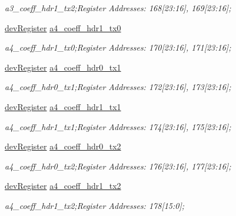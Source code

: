 \begin{DoxyCompactItemize}
\begin{DoxyCompactList}\small\item\em a3\+\_\+coeff\+\_\+hdr1\+\_\+tx2;Register Addresses\+: 168\mbox{[}23\+:16\mbox{]}, 169\mbox{[}23\+:16\mbox{]}; \end{DoxyCompactList}\item 
\mbox{\hyperlink{classdev_register}{dev\+Register}} \mbox{\hyperlink{class_o_p_t3101_registers_abbec89374c9be99384fb541186d2cb9a}{a4\+\_\+coeff\+\_\+hdr1\+\_\+tx0}}
\begin{DoxyCompactList}\small\item\em a4\+\_\+coeff\+\_\+hdr1\+\_\+tx0;Register Addresses\+: 170\mbox{[}23\+:16\mbox{]}, 171\mbox{[}23\+:16\mbox{]}; \end{DoxyCompactList}\item 
\mbox{\hyperlink{classdev_register}{dev\+Register}} \mbox{\hyperlink{class_o_p_t3101_registers_ae1c362f1589d397df087d03639372e29}{a4\+\_\+coeff\+\_\+hdr0\+\_\+tx1}}
\begin{DoxyCompactList}\small\item\em a4\+\_\+coeff\+\_\+hdr0\+\_\+tx1;Register Addresses\+: 172\mbox{[}23\+:16\mbox{]}, 173\mbox{[}23\+:16\mbox{]}; \end{DoxyCompactList}\item 
\mbox{\hyperlink{classdev_register}{dev\+Register}} \mbox{\hyperlink{class_o_p_t3101_registers_a3780f5fcbbb53be998847844966aa092}{a4\+\_\+coeff\+\_\+hdr1\+\_\+tx1}}
\begin{DoxyCompactList}\small\item\em a4\+\_\+coeff\+\_\+hdr1\+\_\+tx1;Register Addresses\+: 174\mbox{[}23\+:16\mbox{]}, 175\mbox{[}23\+:16\mbox{]}; \end{DoxyCompactList}\item 
\mbox{\hyperlink{classdev_register}{dev\+Register}} \mbox{\hyperlink{class_o_p_t3101_registers_ab678cdb94b74b62bf199208e10982059}{a4\+\_\+coeff\+\_\+hdr0\+\_\+tx2}}
\begin{DoxyCompactList}\small\item\em a4\+\_\+coeff\+\_\+hdr0\+\_\+tx2;Register Addresses\+: 176\mbox{[}23\+:16\mbox{]}, 177\mbox{[}23\+:16\mbox{]}; \end{DoxyCompactList}\item 
\mbox{\hyperlink{classdev_register}{dev\+Register}} \mbox{\hyperlink{class_o_p_t3101_registers_a26a0b8ee637d73bf8ac532387837d192}{a4\+\_\+coeff\+\_\+hdr1\+\_\+tx2}}
\begin{DoxyCompactList}\small\item\em a4\+\_\+coeff\+\_\+hdr1\+\_\+tx2;Register Addresses\+: 178\mbox{[}15\+:0\mbox{]}; \end{DoxyCompactList}\item 

\end{DoxyCompactItemize}
